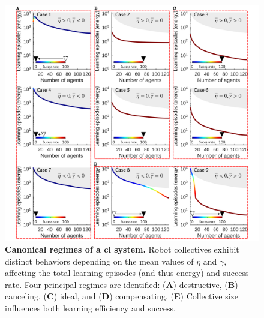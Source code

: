 \documentclass[12pt]{article}
\begin{document}
\begin{figure}[t!]
	\centering
	\hspace*{\fill}
	\includegraphics[width=14cm]{collective_learning_cases.png}
	\hspace*{\fill}
	\caption[] {\label{fig:collective_learning_cases} \textbf{Canonical regimes of a \acl{cl} system.} Robot collectives exhibit distinct behaviors depending on the mean values of $\eta$ and $\gamma$, affecting the total learning episodes (and thus energy) and success rate. Four principal regimes are identified: (\textbf{A}) destructive, (\textbf{B}) canceling, (\textbf{C}) ideal, and (\textbf{D}) compensating. (\textbf{E}) Collective size influences both learning efficiency and success.}
\end{figure}
\end{document}
